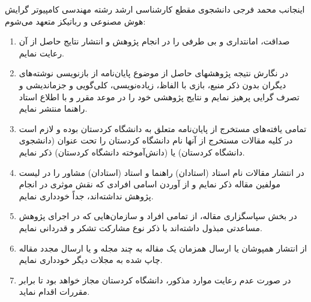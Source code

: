 {	اینجانب محمد فرجی دانشجوی مقطع کارشناسی ارشد رشته مهندسی کامپیوتر گرایش هوش مصنوعی و رباتیکز متعهد می‌شوم:
	
	\begin{enumerate}
		\item صداقت، امانتداری و بی طرفی را در انجام پژوهش  و انتشار نتایج حاصل از آن رعایت نمایم.
		\item در نگارش نتیجه پژوهشهای حاصل از موضوع پایان‌نامه از بازنویسی نوشته‌های دیگران بدون ذکر منبع، بازی با الفاظ، زیاده‌‌نویسی، كلی‌گویی و جزماندیشی و تصرف گرایی پرهیز نمایم و نتایج پژوهشی خود را در موعد مقرر و با اطلاع استاد راهنما منتشر نمایم.
		
		\item  تمامی یافته‌های مستخرج از پایان‌نامه متعلق به دانشگاه کردستان بوده و لازم است در کلیه مقالات مستخرج از آنها نام دانشگاه کردستان را تحت عنوان (دانشجوی دانشگاه کردستان) یا 				(دانش‌آموخته دانشگاه کردستان) ذکر نمایم.
		
		\item در انتشار مقالات نام استاد (استادان) راهنما و استاد (استادان) مشاور را در لیست مولفین مقاله ذکر نمایم و از آوردن اسامی افرادی که نقش موثری در انجام پژوهش نداشته‌اند، جداً خودداری نمایم.
		
		\item در بخش سپاسگزاری مقاله، از تمامی افراد و سازمان‌هایی که در اجرای پژوهش مساعدتی مبذول داشته‌اند با ذکر نوع مشارکت تشکر و قدردانی نمایم.
		\item از انتشار همپوشان یا ارسال همزمان یک مقاله به چند مجله و یا ارسال مجدد مقاله چاپ شده به مجلات دیگر خودداری نمایم.
		\item  در صورت عدم رعایت موارد مذکور، دانشگاه کردستان مجاز خواهد بود تا برابر مقررات اقدام نماید.
		
		
	\end{enumerate}
	\begin{center}
		\textbf{}
	\end{center}
	
}
